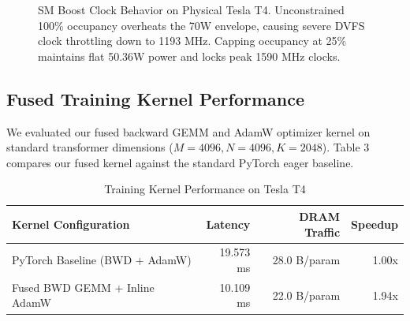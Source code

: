 \documentclass[10pt,twocolumn,letterpaper]{article}
\begin{document}
\begin{figure}[t]
\centering
{}
\caption{SM Boost Clock Behavior on Physical Tesla T4. Unconstrained 100\% occupancy overheats the 70W envelope, causing severe DVFS clock throttling down to 1193 MHz. Capping occupancy at 25\% maintains flat 50.36W power and locks peak 1590 MHz clocks.}
\label{fig:clock_stability}
\end{figure}

\subsection{Fused Training Kernel Performance}
We evaluated our fused backward GEMM and AdamW optimizer kernel on standard transformer dimensions ($M=4096, N=4096, K=2048$). Table 3 compares our fused kernel against the standard PyTorch eager baseline.

\begin{table}[h]
\centering
\caption{Training Kernel Performance on Tesla T4}
\label{tab:training_perf}
\small
\begin{tabular}{lrrr}
\toprule
Kernel Configuration & Latency & DRAM Traffic & Speedup \\
\midrule
PyTorch Baseline (BWD + AdamW) & 19.573 ms & 28.0 B/param & 1.00x \\
Fused BWD GEMM + Inline AdamW  & 10.109 ms & 22.0 B/param & 1.94x \\
\bottomrule
\end{tabular}
\end{table}
\end{document}
